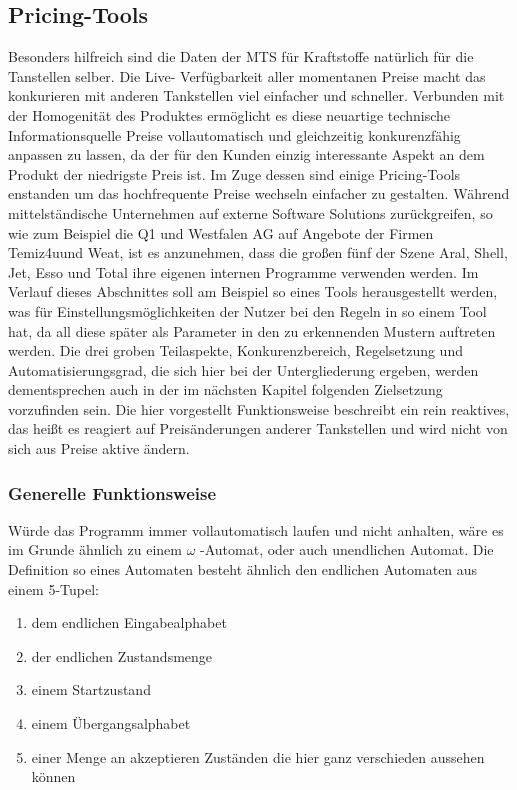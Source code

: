 \documentclass[12pt,a4paper,bibliography=totocnumbered,listof=totocnumbered]{scrartcl}
\begin{document}
\subsection{Pricing-Tools}

Besonders hilfreich sind die Daten der MTS für Kraftstoffe natürlich für die Tanstellen selber. Die Live- Verfügbarkeit aller momentanen Preise macht das konkurieren mit anderen Tankstellen viel einfacher und schneller. Verbunden mit der Homogenität des Produktes ermöglicht es diese neuartige technische Informationsquelle Preise vollautomatisch und gleichzeitig konkurenzfähig anpassen zu lassen, da der für den Kunden einzig interessante Aspekt an dem Produkt der niedrigste Preis ist. Im Zuge dessen sind einige Pricing-Tools enstanden um das hochfrequente Preise wechseln einfacher zu gestalten. Während mittelständische Unternehmen auf externe Software Solutions zurückgreifen, so wie zum Beispiel die Q1 und Westfalen AG auf Angebote der Firmen Temiz4u\footnotemark[1] und Weat\footnotemark[2], ist es anzunehmen, dass die großen fünf der Szene Aral, Shell, Jet, Esso und Total ihre eigenen internen Programme verwenden werden. Im Verlauf dieses Abschnittes soll am Beispiel so eines Tools herausgestellt werden, was für Einstellungsmöglichkeiten der Nutzer bei den Regeln in so einem Tool hat, da all diese später als Parameter in den zu erkennenden Mustern auftreten werden. Die drei groben Teilaspekte, Konkurenzbereich, Regelsetzung und Automatisierungsgrad, die sich hier bei der Untergliederung ergeben, werden dementsprechen auch in der im nächsten Kapitel folgenden Zielsetzung vorzufinden sein. Die hier vorgestellt Funktionsweise beschreibt ein rein reaktives, das heißt es reagiert auf Preisänderungen anderer Tankstellen und wird nicht von sich aus Preise aktive ändern.


\subsubsection{Generelle Funktionsweise}
Würde das Programm immer vollautomatisch laufen und nicht anhalten, wäre es im Grunde ähnlich zu einem $\omega$ -Automat, oder auch unendlichen Automat. Die Definition so eines Automaten besteht ähnlich den endlichen Automaten aus einem 5-Tupel:
\begin{enumerate}
\item dem endlichen Eingabealphabet
\item der endlichen Zustandsmenge
\item einem Startzustand
\item einem Übergangsalphabet
\item einer Menge an akzeptieren Zuständen die hier ganz verschieden aussehen können
\end{enumerate}
\end{document}
